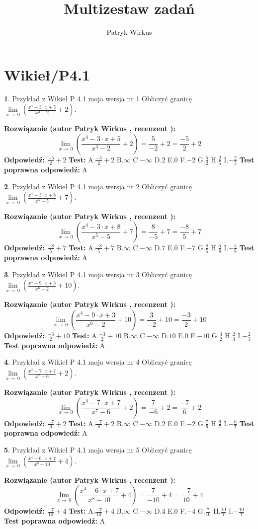 \documentclass[12pt, a4paper]{article}
\title{Multizestaw zadań}
\author{Patryk Wirkus}
\date{}
\theoremstyle{definition} %
\newtheorem{zad}{}
\newcommand{\kategoria}[1]{\section{#1}}
\newcommand{\zadStart}[1]{\begin{zad}#1\newline}
\newcommand{\zadStop}{\end{zad}}
\newcommand{\rozwStart}[2]{\noindent \textbf{Rozwiązanie (autor #1 , recenzent #2): }\newline}
\newcommand{\rozwStop}{\newline}
\newcommand{\odpStart}{\noindent \textbf{Odpowiedź:}\newline}
\newcommand{\odpStop}{\newline}
\newcommand{\testStart}{\noindent \textbf{Test:}\newline}
\newcommand{\testStop}{\newline}
\newcommand{\kluczStart}{\noindent \textbf{Test poprawna odpowiedź:}\newline}
\newcommand{\kluczStop}{\newline}
\begin{document}
\maketitle

\kategoria{Wikieł/P4.1}


\zadStart{Przykład z Wikieł P 4.1 moja wersja nr 1}
Obliczyć granicę $\lim\limits_{x\to\ 0}(\frac{x^{4}-3 \cdot x +5}{x^{3}-2}+2)$.
\zadStop
\rozwStart{Patryk Wirkus}{}
$$\lim\limits_{x\to\ 0}(\frac{x^{4}-3 \cdot x +5}{x^{3}-2}+2)=\frac{5}{-2}+2=\frac{-5}{2}+2$$
\rozwStop
\odpStart
$\frac{-5}{2}+2$
\odpStop
\testStart
A.$\frac{-5}{2}+2$
B.$\infty$
C.$-\infty$
D.$2$
E.$0$
F.$-2$
G.$\frac{5}{2}$
H.$\frac{2}{5}$
I.$-\frac{2}{5}$
\testStop
\kluczStart
A
\kluczStop



\zadStart{Przykład z Wikieł P 4.1 moja wersja nr 2}
Obliczyć granicę $\lim\limits_{x\to\ 0}(\frac{x^{4}-3 \cdot x +8}{x^{5}-5}+7)$.
\zadStop
\rozwStart{Patryk Wirkus}{}
$$\lim\limits_{x\to\ 0}(\frac{x^{4}-3 \cdot x +8}{x^{5}-5}+7)=\frac{8}{-5}+7=\frac{-8}{5}+7$$
\rozwStop
\odpStart
$\frac{-8}{5}+7$
\odpStop
\testStart
A.$\frac{-8}{5}+7$
B.$\infty$
C.$-\infty$
D.$7$
E.$0$
F.$-7$
G.$\frac{8}{5}$
H.$\frac{5}{8}$
I.$-\frac{5}{8}$
\testStop
\kluczStart
A
\kluczStop



\zadStart{Przykład z Wikieł P 4.1 moja wersja nr 3}
Obliczyć granicę $\lim\limits_{x\to\ 0}(\frac{x^{4}-9 \cdot x +3}{x^{6}-2}+10)$.
\zadStop
\rozwStart{Patryk Wirkus}{}
$$\lim\limits_{x\to\ 0}(\frac{x^{4}-9 \cdot x +3}{x^{6}-2}+10)=\frac{3}{-2}+10=\frac{-3}{2}+10$$
\rozwStop
\odpStart
$\frac{-3}{2}+10$
\odpStop
\testStart
A.$\frac{-3}{2}+10$
B.$\infty$
C.$-\infty$
D.$10$
E.$0$
F.$-10$
G.$\frac{3}{2}$
H.$\frac{2}{3}$
I.$-\frac{2}{3}$
\testStop
\kluczStart
A
\kluczStop



\zadStart{Przykład z Wikieł P 4.1 moja wersja nr 4}
Obliczyć granicę $\lim\limits_{x\to\ 0}(\frac{x^{4}-7 \cdot x +7}{x^{7}-6}+2)$.
\zadStop
\rozwStart{Patryk Wirkus}{}
$$\lim\limits_{x\to\ 0}(\frac{x^{4}-7 \cdot x +7}{x^{7}-6}+2)=\frac{7}{-6}+2=\frac{-7}{6}+2$$
\rozwStop
\odpStart
$\frac{-7}{6}+2$
\odpStop
\testStart
A.$\frac{-7}{6}+2$
B.$\infty$
C.$-\infty$
D.$2$
E.$0$
F.$-2$
G.$\frac{7}{6}$
H.$\frac{6}{7}$
I.$-\frac{6}{7}$
\testStop
\kluczStart
A
\kluczStop



\zadStart{Przykład z Wikieł P 4.1 moja wersja nr 5}
Obliczyć granicę $\lim\limits_{x\to\ 0}(\frac{x^{4}-6 \cdot x +7}{x^{8}-10}+4)$.
\zadStop
\rozwStart{Patryk Wirkus}{}
$$\lim\limits_{x\to\ 0}(\frac{x^{4}-6 \cdot x +7}{x^{8}-10}+4)=\frac{7}{-10}+4=\frac{-7}{10}+4$$
\rozwStop
\odpStart
$\frac{-7}{10}+4$
\odpStop
\testStart
A.$\frac{-7}{10}+4$
B.$\infty$
C.$-\infty$
D.$4$
E.$0$
F.$-4$
G.$\frac{7}{10}$
H.$\frac{10}{7}$
I.$-\frac{10}{7}$
\testStop
\kluczStart
A
\kluczStop
\end{document}
